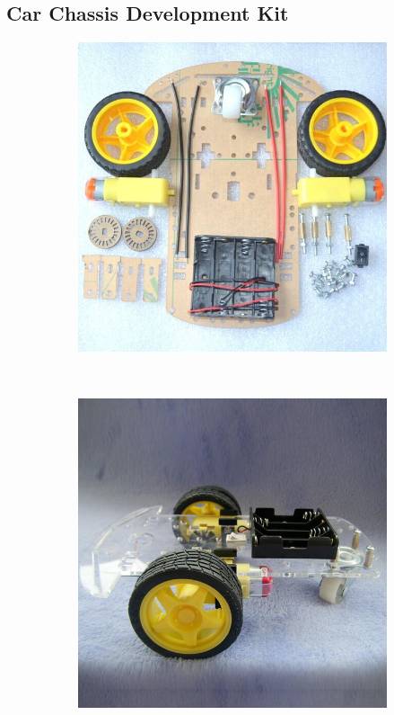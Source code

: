 \subsection{Car Chassis Development Kit} 

\begin{figure}[h!]
        \centering
        \begin{subfigure}[b]{0.5\textwidth}
                \includegraphics[width=\textwidth]{./Pictures/Car-Chassis-Kit.jpg}
        \end{subfigure}%
        ~ %
        \begin{subfigure}[b]{0.5\textwidth}
                \includegraphics[width=\textwidth]{./Pictures/Car-Chassis-Kit2.jpg}

\end{subfigure}
\end{figure}
